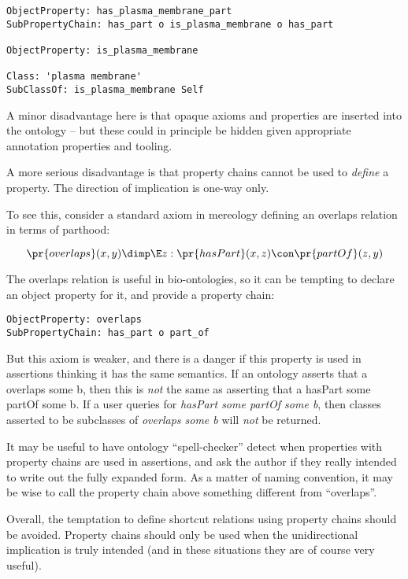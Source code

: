 \documentclass{llncs}
\begin{document}
\begin{verbatim}
ObjectProperty: has_plasma_membrane_part 
SubPropertyChain: has_part o is_plasma_membrane o has_part

ObjectProperty: is_plasma_membrane

Class: 'plasma membrane'
SubClassOf: is_plasma_membrane Self
\end{verbatim}

A minor disadvantage here is that opaque axioms and properties are
inserted into the ontology -- but these could in principle be hidden
given appropriate annotation properties and tooling.

A more serious disadvantage is that property chains cannot be used to
\emph{define} a property. The direction of implication is one-way
only.

To see this, consider a standard axiom in mereology defining an
overlaps relation in terms of parthood:

$$
\pr{overlaps}(x,y) \dimp \E z: \pr{hasPart}(x,z) \con \pr{partOf}(z,y)
$$

The overlaps relation is useful in bio-ontologies\cite{dahdul2009}, so
it can be tempting to declare an object property for it, and provide a
property chain:

\begin{verbatim}
ObjectProperty: overlaps
SubPropertyChain: has_part o part_of
\end{verbatim}

But this axiom is weaker, and there is a danger if this property is
used in assertions thinking it has the same semantics. If an ontology
asserts that a overlaps some b, then this is \emph{not} the same as
asserting that a hasPart some partOf some b. If a user queries for
\emph{hasPart some partOf some b}, then classes asserted to be
subclasses of \emph{overlaps some b} will \emph{not} be returned.

It may be useful to have ontology ``spell-checker'' detect when
properties with property chains are used in assertions, and ask the
author if they really intended to write out the fully expanded
form. As a matter of naming convention, it may be wise to call the
property chain above something different from ``overlaps''.

Overall, the temptation to define shortcut relations using property
chains should be avoided. Property chains should only be used when the
unidirectional implication is truly intended (and in these situations
they are of course very useful).
\end{document}
